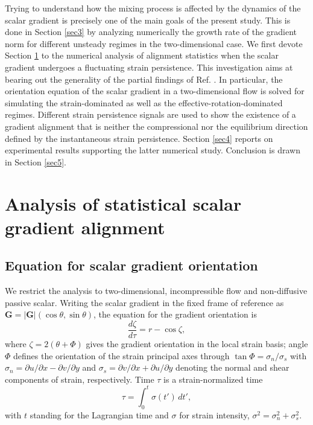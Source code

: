 \documentclass[doublespacing]{elsart}
\begin{document}
Trying to understand
how the mixing process is affected by the
dynamics of the scalar gradient is precisely one of
the main goals of the present study.
This is done in Section \ref{sec3} by 
analyzing numerically the growth rate of the gradient
norm for different unsteady regimes
in the two-dimensional case.
We first devote Section \ref{sec2} to the numerical analysis of
alignment statistics when the scalar gradient undergoes
a fluctuating strain persistence. 
This investigation
aims at bearing out the generality of the partial findings of
Ref. \cite{Gal05}. In particular, the orientation equation
of the scalar gradient in a two-dimensional flow
is solved for simulating the strain-dominated as well as the 
effective-rotation-dominated
regimes. 
Different
strain persistence signals are 
used to show the existence 
of a gradient alignment 
that 
is neither the compressional nor the equilibrium direction 
defined by the instantaneous strain persistence.
Section \ref{sec4} reports on experimental results 
supporting the latter numerical study.
Conclusion is drawn in Section \ref{sec5}.
\section{Analysis of statistical scalar gradient alignment}
\label{sec2}
\subsection{Equation for scalar gradient orientation}
\label{sec2.1}
We restrict the analysis to two-dimensional, incompressible flow and
non-diffusive passive scalar. 
Writing the scalar
gradient in the fixed frame of reference as
$ {\bm G} = |{\bm G}|(\cos \theta,\sin \theta) $,
the equation for the gradient orientation 
is \cite{Lal99,Lal01}
\begin{equation}
\label{eq1}
\frac{d \zeta}{d \tau}
=
r - \cos \zeta,
\end{equation}
where
$ \zeta = 2(\theta + \Phi) $ gives the gradient orientation in the 
local strain basis;
angle
$ \Phi $ 
defines the
orientation of the strain principal axes
through
$ \tan \Phi = \sigma_n / \sigma_s $
with
$ \sigma_n = \partial u/\partial x - \partial v/\partial y $
and $ \sigma_s  = \partial v/\partial x + \partial u/\partial y $ 
denoting 
the normal and shear components
of strain, respectively.
Time $ \tau $ is a strain-normalized time
\[
\tau = \int_0^t \sigma(t') \, dt',
\]
with $ t $ standing for the Lagrangian time and $ \sigma $ for
strain intensity, $ \sigma^2 = \sigma_n^2 + \sigma_s^2 $.
\end{document}
